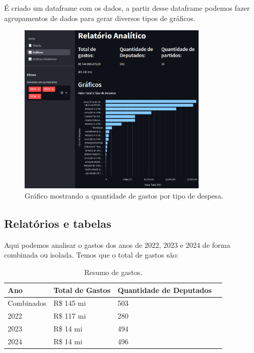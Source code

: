 \documentclass[12pt, a4paper]{article}
\begin{document}
É criado um dataframe com os dados, a partir desse dataframe podemos fazer agrupamentos de dados para gerar diversos tipos de gráficos.


\begin{figure}[!htbp]
	\centering
	\includegraphics[width=0.8\textwidth]{assets/2_plot1.png}
	\caption{Gráfico mostrando a quantidade de gastos por tipo de despesa.}
	\label{fig:criacao_postgresql}
\end{figure}

\subsection{Relatórios e tabelas}

Aqui podemos analisar o gastos dos anos de 2022, 2023 e 2024 de forma combinada ou isolada. Temos que o total de gastos são:

\begin{table}[htbp]
	\centering
	\begin{tabular}{llll}
		\toprule
		Ano & Total de Gastos & Quantidade de Deputados \\
		\midrule
		Combinados & R\$ 145 mi & 503 \\
		2022 & R\$ 117 mi & 280 \\
		2023 & R\$ 14 mi & 494 \\
		2024 & R\$ 14 mi & 496 \\
		\bottomrule
	\end{tabular}
	\caption{Resumo de gastos.}
	\label{tab:minhatabela1}
\end{table}
\end{document}
